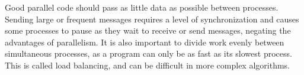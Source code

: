 \begin{info}
Good parallel code should pass as little data as possible between processes.
Sending large or frequent messages requires a level of synchronization and causes some processes to pause as they wait to receive or send messages, negating the advantages of parallelism.
It is also important to divide work evenly between simultaneous processes, as a program can only be as fast as its slowest process.
This is called load balancing, and can be difficult in more complex algorithms.
\end{info}

\begin{comment}

\newpage
\section*{Additional Material} %

\subsection*{Installation of MPI}

MPI is a library of functions that interface with your computer's hardware to provide optimal parallel computing performance.
In order to use mpi4py, we need to have an MPI Library on installed on the computer as well as the mpi4py package.
When you invoke mpi4py in your python code, mpi4py takes what you have written in python and applies it using an MPI Library, so only installing mpi4py is not enough to use MPI.


\subsubsection*{Installing MPI Library}
\begin{enumerate}

\item For Linux/Mac:
We recommend using OpenMPI for your MPI Library installation, though it is not the only library available.
\begin{itemize}
    \item Download the binary files from \url{https://www-lb.open-mpi.org/software/ompi/v4.0/}.
    \item Extract the files from their compressed form and navigate into the new folder titled "openmpi-X.X.X".
    \item Configure the files so that they will install correctly on your machine.
    \item Compile OpenMPI and install it.
\end{itemize}


\end{comment}
